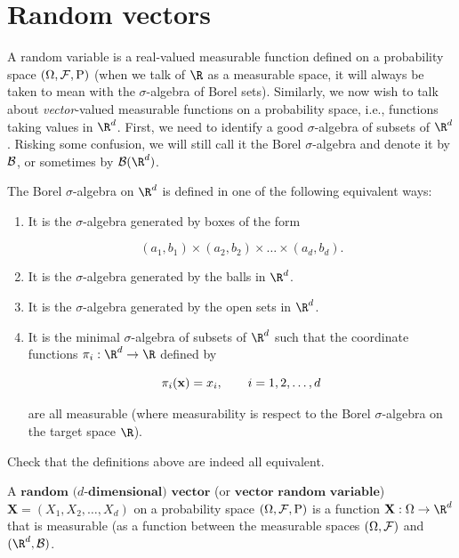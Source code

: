 \section{Random vectors}

A random variable is a real-valued measurable
function defined on a probability space
$(\Omega, {\cal F}, \mathrm{P})$ (when we talk of $\R$
as a measurable space, it will always be taken to mean
with the $\sigma$-algebra of Borel sets). Similarly,
we now wish to talk about \emph{vector}-valued measurable
functions on a probability space, i.e., functions
taking values in $\R^d$. First, we need to identify a
good $\sigma$-algebra of subsets of $\R^d$. Risking
some confusion, we will still call it the Borel
$\sigma$-algebra and denote it by ${\cal B}$, or
sometimes by ${\cal B}(\R^d)$.

\begin{defn}
\label{defi-borelrd}
The Borel $\sigma$-algebra on $\R^d$ is defined in
one of the following equivalent ways:

\begin{enumerate}[label=(\roman*)]
\item It is the $\sigma$-algebra generated by boxes of the
form

\[
(a_1,b_1) \times (a_2,b_2) \times \ldots \times (a_d,b_d).
\]

\item It is the $\sigma$-algebra generated by the balls in
$\R^d$.

\item It is the $\sigma$-algebra generated by the open sets
in $\R^d$.

\item It is the minimal $\sigma$-algebra of subsets of
$\R^d$ such that the coordinate functions
$\pi_i:\R^d\to\R$ defined by

\[
\pi_i({\bf x}) = x_i, \qquad i=1,2,\ldots,d
\]

\noindent are all measurable (where measurability is respect to
the Borel $\sigma$-algebra on the target space $\R$).
\end{enumerate}

\end{defn}

\begin{xexercise}
Check that the definitions above are indeed all
equivalent.
\end{xexercise}

\begin{defn}
A $\textbf{random ($d$-dimensional) vector}$ (or
$\textbf{vector random variable}$)
$\mathbf{X}=(X_1,X_2,\ldots,X_d)$ on a probability
space $(\Omega, {\cal F}, \mathrm{P})$ is a function
$\mathbf{X}:\Omega\to\R^d$ that is measurable (as a
function between the measurable spaces
$(\Omega, {\cal F})$ and $(\R^d, {\cal B})$.
\end{defn}

